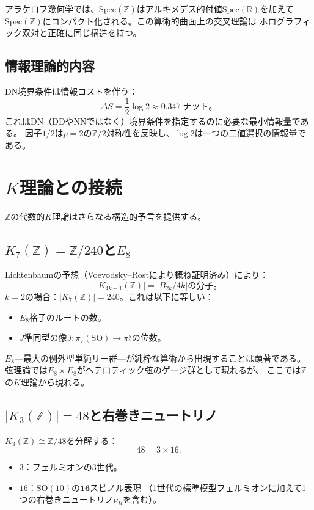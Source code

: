 \documentclass[12pt,a4paper]{article}
\theoremstyle{definition}
\newcommand{\Spec}{\mathrm{Spec}}
\newcommand{\Z}{\mathbb{Z}}
\newcommand{\R}{\mathbb{R}}
\begin{document}
アラケロフ幾何学では、$\Spec(\Z)$はアルキメデス的付値$\Spec(\R)$を加えて
$\overline{\Spec(\Z)}$にコンパクト化される。この算術的曲面上の交叉理論は
ホログラフィック双対と正確に同じ構造を持つ。

\subsection{情報理論的内容}

DN境界条件は情報コストを伴う：
\[
  \Delta S = \frac{1}{2}\log 2 \approx 0.347\;\text{ナット}。
\]
これはDN（DDやNNではなく）境界条件を指定するのに必要な最小情報量である。
因子$1/2$は$p=2$の$\Z/2$対称性を反映し、$\log 2$は一つの二値選択の情報量である。

\section{$K$理論との接続}\label{sec:Ktheory}

$\Z$の代数的$K$理論はさらなる構造的予言を提供する。

\subsection{$K_7(\Z)=\Z/240$と$E_8$}

Lichtenbaumの予想（Voevodsky--Rostにより概ね証明済み）により：
\[
  |K_{4k-1}(\Z)|=|B_{2k}/4k|\text{の分子}。
\]
$k=2$の場合：$|K_7(\Z)|=240$。これは以下に等しい：
\begin{itemize}
\item $E_8$格子のルートの数。
\item $J$準同型の像$J:\pi_7(\mathrm{SO})\to\pi_7^s$の位数。
\end{itemize}

$E_8$—最大の例外型単純リー群—が純粋な算術から出現することは顕著である。
弦理論では$E_8\times E_8$がヘテロティック弦のゲージ群として現れるが、
ここでは$\Z$の$K$理論から現れる。

\subsection{$|K_3(\Z)|=48$と右巻きニュートリノ}

$K_3(\Z)\cong\Z/48$を分解する：
\[
  48=3\times 16.
\]
\begin{itemize}
\item $3$：フェルミオンの3世代。
\item $16$：$\mathrm{SO}(10)$の$\mathbf{16}$スピノル表現
  （1世代の標準模型フェルミオンに加えて1つの右巻きニュートリノ$\nu_R$を含む）。
\end{itemize}
\end{document}
